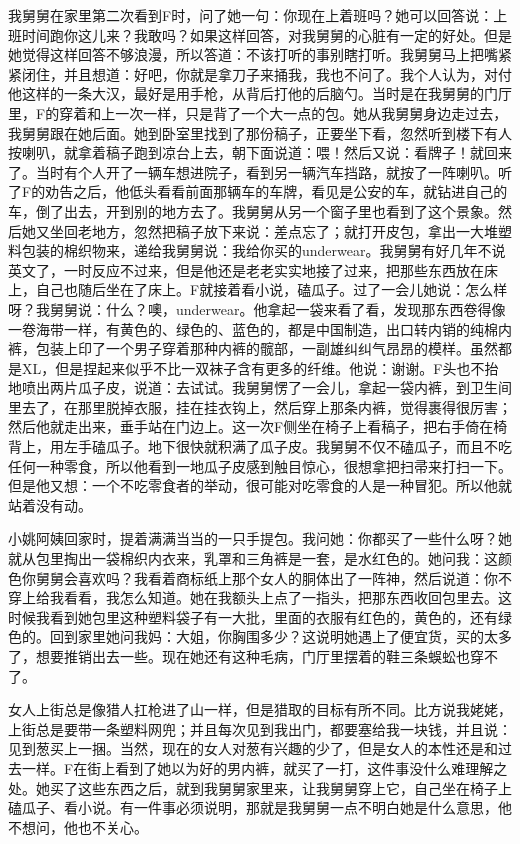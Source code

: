 我舅舅在家里第二次看到F时，问了她一句：你现在上着班吗？她可以回答说：上班时间跑你这儿来？我敢吗？如果这样回答，对我舅舅的心脏有一定的好处。但是她觉得这样回答不够浪漫，所以答道：不该打听的事别瞎打听。我舅舅马上把嘴紧紧闭住，并且想道：好吧，你就是拿刀子来捅我，我也不问了。我个人认为，对付他这样的一条大汉，最好是用手枪，从背后打他的后脑勺。当时是在我舅舅的门厅里，F的穿着和上一次一样，只是背了一个大一点的包。她从我舅舅身边走过去，我舅舅跟在她后面。她到卧室里找到了那份稿子，正要坐下看，忽然听到楼下有人按喇叭，就拿着稿子跑到凉台上去，朝下面说道：喂！然后又说：看牌子！就回来了。当时有个人开了一辆车想进院子，看到另一辆汽车挡路，就按了一阵喇叭。听了F的劝告之后，他低头看看前面那辆车的车牌，看见是公安的车，就钻进自己的车，倒了出去，开到别的地方去了。我舅舅从另一个窗子里也看到了这个景象。然后她又坐回老地方，忽然把稿子放下来说：差点忘了；就打开皮包，拿出一大堆塑料包装的棉织物来，递给我舅舅说：我给你买的underwear。我舅舅有好几年不说英文了，一时反应不过来，但是他还是老老实实地接了过来，把那些东西放在床上，自己也随后坐在了床上。F就接着看小说，磕瓜子。过了一会儿她说：怎么样呀？我舅舅说：什么？噢，underwear。他拿起一袋来看了看，发现那东西卷得像一卷海带一样，有黄色的、绿色的、蓝色的，都是中国制造，出口转内销的纯棉内裤，包装上印了一个男子穿着那种内裤的髋部，一副雄纠纠气昂昂的模样。虽然都是XL，但是捏起来似乎不比一双袜子含有更多的纤维。他说：谢谢。F头也不抬地喷出两片瓜子皮，说道：去试试。我舅舅愣了一会儿，拿起一袋内裤，到卫生间里去了，在那里脱掉衣服，挂在挂衣钩上，然后穿上那条内裤，觉得裹得很厉害；然后他就走出来，垂手站在门边上。这一次F侧坐在椅子上看稿子，把右手倚在椅背上，用左手磕瓜子。地下很快就积满了瓜子皮。我舅舅不仅不磕瓜子，而且不吃任何一种零食，所以他看到一地瓜子皮感到触目惊心，很想拿把扫帚来打扫一下。但是他又想：一个不吃零食者的举动，很可能对吃零食的人是一种冒犯。所以他就站着没有动。 

小姚阿姨回家时，提着满满当当的一只手提包。我问她：你都买了一些什么呀？她就从包里掏出一袋棉织内衣来，乳罩和三角裤是一套，是水红色的。她问我：这颜色你舅舅会喜欢吗？我看着商标纸上那个女人的胴体出了一阵神，然后说道：你不穿上给我看看，我怎么知道。她在我额头上点了一指头，把那东西收回包里去。这时候我看到她包里这种塑料袋子有一大批，里面的衣服有红色的，黄色的，还有绿色的。回到家里她问我妈：大姐，你胸围多少？这说明她遇上了便宜货，买的太多了，想要推销出去一些。现在她还有这种毛病，门厅里摆着的鞋三条蜈蚣也穿不了。 

女人上街总是像猎人扛枪进了山一样，但是猎取的目标有所不同。比方说我姥姥，上街总是要带一条塑料网兜；并且每次见到我出门，都要塞给我一块钱，并且说：见到葱买上一捆。当然，现在的女人对葱有兴趣的少了，但是女人的本性还是和过去一样。F在街上看到了她以为好的男内裤，就买了一打，这件事没什么难理解之处。她买了这些东西之后，就到我舅舅家里来，让我舅舅穿上它，自己坐在椅子上磕瓜子、看小说。有一件事必须说明，那就是我舅舅一点不明白她是什么意思，他不想问，他也不关心。 

